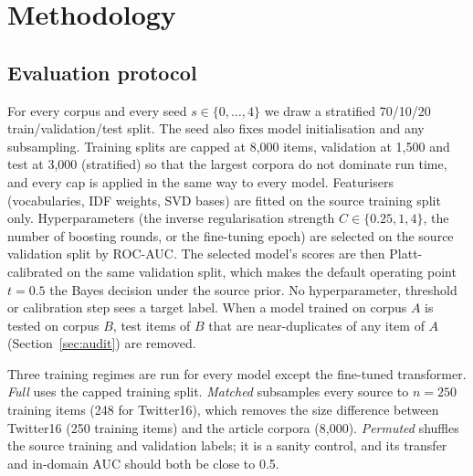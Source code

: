 \section{Methodology}\label{sec:method}

\subsection{Evaluation protocol}\label{sec:protocol}
For every corpus and every seed $s\in\{0,\dots,4\}$ we draw a stratified 70/10/20 train/validation/test split. The seed also fixes model initialisation and any subsampling. Training splits are capped at 8{,}000 items, validation at 1{,}500 and test at 3{,}000 (stratified) so that the largest corpora do not dominate run time, and every cap is applied in the same way to every model. Featurisers (vocabularies, IDF weights, SVD bases) are fitted on the source training split only. Hyperparameters (the inverse regularisation strength $C\in\{0.25,1,4\}$, the number of boosting rounds, or the fine-tuning epoch) are selected on the source validation split by ROC-AUC. The selected model's scores are then Platt-calibrated \citep{platt1999probabilistic} on the same validation split, which makes the default operating point $t=0.5$ the Bayes decision under the source prior. No hyperparameter, threshold or calibration step sees a target label. When a model trained on corpus $A$ is tested on corpus $B$, test items of $B$ that are near-duplicates of any item of $A$ (Section~\ref{sec:audit}) are removed.

Three training regimes are run for every model except the fine-tuned transformer. \emph{Full} uses the capped training split. \emph{Matched} subsamples every source to $n=250$ training items (248 for Twitter16), which removes the size difference between Twitter16 (250 training items) and the article corpora (8{,}000). \emph{Permuted} shuffles the source training and validation labels; it is a sanity control, and its transfer and in-domain AUC should both be close to 0.5.

